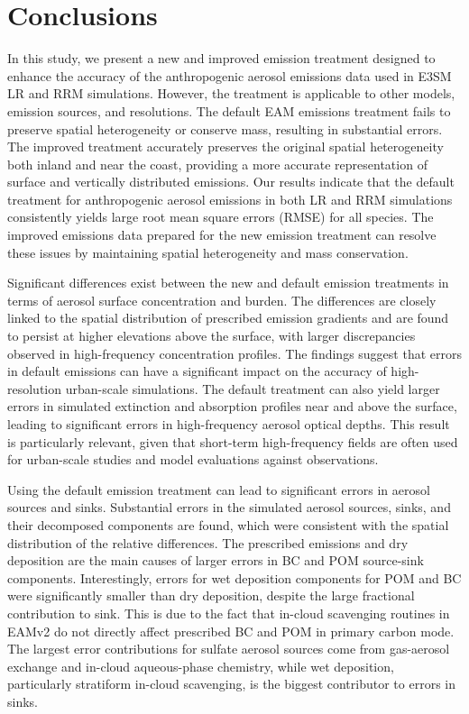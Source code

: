 \section{Conclusions}
In this study, we present a new and improved emission treatment designed to enhance the accuracy of the anthropogenic aerosol emissions data used in E3SM LR and RRM simulations. However, the treatment is applicable to other models, emission sources, and resolutions. The default EAM emissions treatment fails to preserve spatial heterogeneity or conserve mass, resulting in substantial errors. The improved treatment accurately preserves the original spatial heterogeneity both inland and near the coast, providing a more accurate representation of surface and vertically distributed emissions. Our results indicate that the default treatment for anthropogenic aerosol emissions in both LR and RRM simulations consistently yields large root mean square errors (RMSE) for all species. The improved emissions data prepared for the new emission treatment can resolve these issues by maintaining spatial heterogeneity and mass conservation.

Significant differences exist between the new and default emission treatments in terms of aerosol surface concentration and burden. The differences are closely linked to the spatial distribution of prescribed emission gradients and are found to persist at higher elevations above the surface, with larger discrepancies observed in high-frequency concentration profiles. The findings suggest that errors in default emissions can have a significant impact on the accuracy of high-resolution urban-scale simulations. The default treatment can also yield larger errors in simulated extinction and absorption profiles near and above the surface, leading to significant errors in high-frequency aerosol optical depths. This result is particularly relevant, given that short-term high-frequency fields are often used for urban-scale studies and model evaluations against observations.

Using the default emission treatment can lead to significant errors in aerosol sources and sinks. Substantial errors in the simulated aerosol sources, sinks, and their decomposed components are found, which were consistent with the spatial distribution of the relative differences. The prescribed emissions and dry deposition are the main causes of larger errors in BC and POM source-sink components. Interestingly, errors for wet deposition components for POM and BC were significantly smaller than dry deposition, despite the large fractional contribution to sink. This is due to the fact that in-cloud scavenging routines in EAMv2 do not directly affect prescribed BC and POM in primary carbon mode. The largest error contributions for sulfate aerosol sources come from gas-aerosol exchange and in-cloud aqueous-phase chemistry, while wet deposition, particularly stratiform in-cloud scavenging, is the biggest contributor to errors in sinks. 

